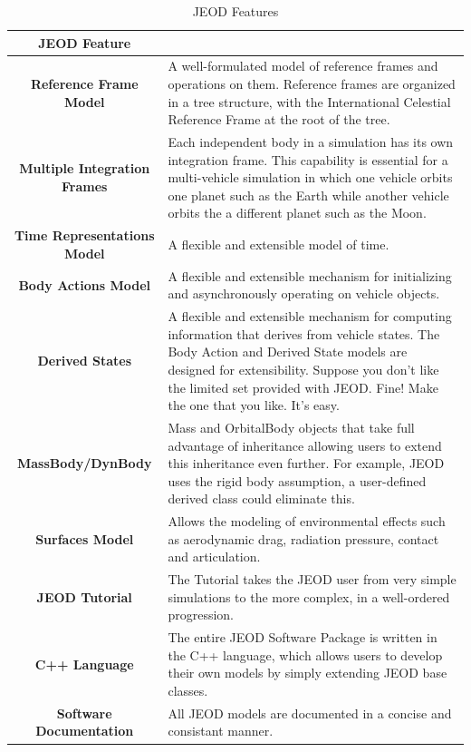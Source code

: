 \begin{table}[h!]
\begin{center}
\caption{JEOD Features} \vspace{5mm} \label{tbl:benifits}
\begin{tabular}{||c||p{9cm}||} \hline
{\bf JEOD Feature}  \\ \hline \hline
{\bf Reference Frame Model} & {A well-formulated model of reference frames and operations on them.  Reference frames are organized in a tree structure, with the International Celestial Reference Frame at the root of the tree.}  \\ \hline \hline
{\bf Multiple Integration Frames} & {Each independent body in a simulation has its own integration frame. This capability is essential for a multi-vehicle simulation in which one vehicle orbits one planet such as the Earth while another vehicle orbits the a different planet such as the Moon.}  \\ \hline \hline
{\bf Time Representations Model} & {A flexible and extensible model of time.}  \\ \hline \hline
{\bf Body Actions Model} & {A flexible and extensible mechanism for initializing and asynchronously operating on vehicle objects.}  \\ \hline \hline
{\bf Derived States} & {A flexible and extensible mechanism for computing information that derives from vehicle states.  The Body Action and Derived State models are designed for extensibility.  Suppose you don't like the limited set provided with JEOD. Fine! Make the one that you like. It's easy.}  \\ \hline \hline
{\bf MassBody/DynBody} & {Mass and OrbitalBody objects that take full advantage of inheritance allowing users to extend this inheritance even further. For example, JEOD uses the rigid body assumption, a user-defined derived class could eliminate this.}  \\ \hline \hline
{\bf Surfaces Model} & {Allows the modeling of environmental effects such as aerodynamic drag, radiation pressure, contact and articulation.}  \\ \hline \hline
{\bf JEOD Tutorial} & {The Tutorial takes the JEOD user from very simple simulations to the more complex, in a well-ordered progression.}  \\ \hline \hline
{\bf C++ Language} & {The entire JEOD Software Package is written in the C++ language, which allows users to develop their own models by simply extending JEOD base classes.}  \\ \hline \hline
{\bf Software Documentation} & {All JEOD models are documented in a concise and consistant manner.}  \\ \hline \hline
\end{tabular}
\end{center}
\end{table}

